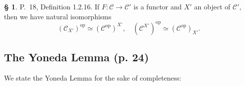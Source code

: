 \documentclass[12pt]{article}
\theoremstyle{remark}
\theoremstyle{definition}
\newtheorem{s}[thm]{\S}
\newcommand{\C}{\mathcal C}
\DeclareMathOperator{\op}{op}
\begin{document}
%

\begin{s}
P.~18, Definition 1.2.16. If $F:\C\to\C'$ is a functor and $X'$ an object of $\C'$, then we have natural isomorphisms 
\begin{equation}\label{opslice}
(\C_{X'})^{\op}\simeq(\C^{\op})^{X'},\quad(\C^{X'})^{\op}\simeq(\C^{\op})_{X'}.
\end{equation}
\end{s}


\subsection{The Yoneda Lemma (p. 24)}

We state the Yoneda Lemma for the sake of completeness:
\end{document}
